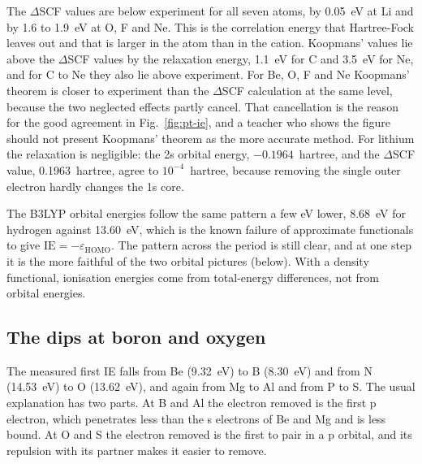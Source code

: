The $\Delta$SCF values are below experiment for all seven atoms, by 0.05~eV at Li and by 1.6 to 1.9~eV at O, F and Ne. This is the correlation energy that Hartree-Fock leaves out and that is larger in the atom than in the cation. Koopmans' values lie above the $\Delta$SCF values by the relaxation energy, 1.1~eV for C and 3.5~eV for Ne, and for C to Ne they also lie above experiment. For Be, O, F and Ne Koopmans' theorem is closer to experiment than the $\Delta$SCF calculation at the same level, because the two neglected effects partly cancel. That cancellation is the reason for the good agreement in Fig.~\ref{fig:pt-ie}, and a teacher who shows the figure should not present Koopmans' theorem as the more accurate method. For lithium the relaxation is negligible: the 2s orbital energy, $-0.1964$~hartree, and the $\Delta$SCF value, 0.1963~hartree, agree to $10^{-4}$~hartree, because removing the single outer electron hardly changes the 1s core.

The B3LYP orbital energies follow the same pattern a few eV lower, 8.68~eV for hydrogen against 13.60~eV, which is the known failure of approximate functionals to give $\mathrm{IE} = -\varepsilon_\mathrm{HOMO}$. The pattern across the period is still clear, and at one step it is the more faithful of the two orbital pictures (below). With a density functional, ionisation energies come from total-energy differences, not from orbital energies.

\subsection{The dips at boron and oxygen}
\label{sec:pt-dips}
The measured first IE falls from Be (9.32~eV) to B (8.30~eV) and from N (14.53~eV) to O (13.62~eV), and again from Mg to Al and from P to S. The usual explanation has two parts. At B and Al the electron removed is the first p electron, which penetrates less than the s electrons of Be and Mg and is less bound. At O and S the electron removed is the first to pair in a p orbital, and its repulsion with its partner makes it easier to remove.

